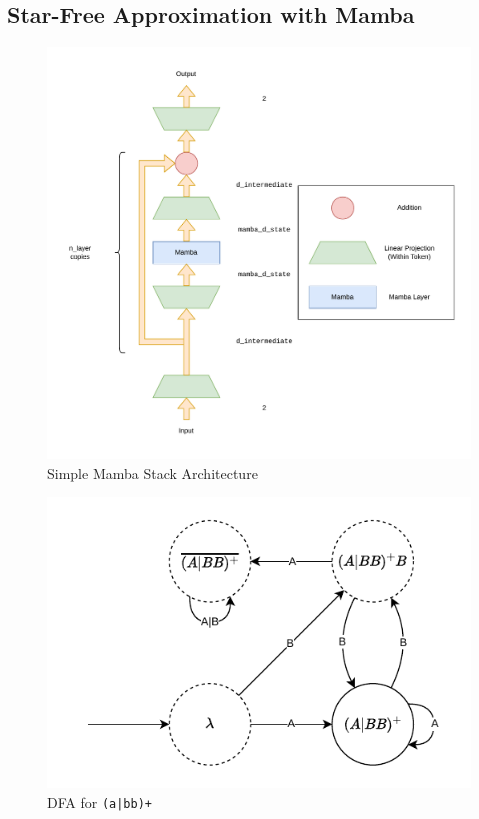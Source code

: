 \subsection{Star-Free Approximation with Mamba}
\begin{figure}
    \includegraphics[width=\textwidth]{figures/sequence_stack_simple.pdf}
    \caption{Simple Mamba Stack Architecture}
    \label{simplestack}
\end{figure}

\begin{figure}
    \includegraphics[width=\textwidth]{figures/a_or_bb_plus_dfa.pdf}
    \caption{DFA for \texttt{(a|bb)+}}
    \label{a_or_bb_plus_dfa}
\end{figure}


